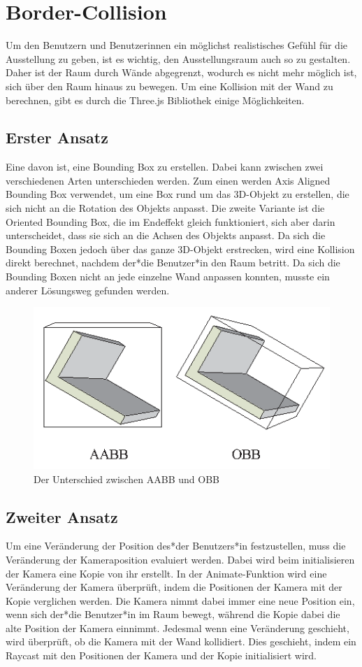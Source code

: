 \section{Border-Collision}

Um den Benutzern und Benutzerinnen ein möglichst realistisches Gefühl für die Ausstellung zu geben, ist es wichtig, den Ausstellungsraum auch so zu gestalten. Daher ist der Raum durch Wände abgegrenzt, wodurch es nicht mehr möglich ist, sich über den Raum hinaus zu bewegen. 
Um eine Kollision mit der Wand zu berechnen, gibt es durch die Three.js Bibliothek einige Möglichkeiten.


\subsection{Erster Ansatz}
Eine davon ist, eine Bounding Box zu erstellen. Dabei kann zwischen zwei verschiedenen Arten unterschieden werden. Zum einen werden Axis Aligned Bounding Box verwendet, um eine Box rund um das 3D-Objekt zu erstellen, die sich nicht an die Rotation des Objekts anpasst. Die zweite Variante ist die Oriented Bounding Box, die im Endeffekt gleich funktioniert, sich aber darin unterscheidet, dass sie sich an die Achsen des Objekts anpasst. Da sich die Bounding Boxen jedoch über das ganze 3D-Objekt erstrecken, wird eine Kollision direkt berechnet, nachdem der*die Benutzer*in den Raum betritt. Da sich die Bounding Boxen nicht an jede einzelne Wand anpassen konnten, musste ein anderer Lösungsweg gefunden werden.
\begin{figure}
    \centering
    \includegraphics[scale=0.65]{pics/aabb_obb.png}
    \caption{Der Unterschied zwischen AABB und OBB}
    \label{fig:impl:aabb_obb}
\end{figure}

\subsection{Zweiter Ansatz}
Um eine Veränderung der Position des*der Benutzers*in festzustellen, muss die Veränderung der Kameraposition evaluiert werden. Dabei wird beim initialisieren der Kamera eine Kopie von ihr erstellt. In der Animate-Funktion wird eine Veränderung der Kamera überprüft, indem die Positionen der Kamera mit der Kopie verglichen werden. Die Kamera nimmt dabei immer eine neue Position ein, wenn sich der*die Benutzer*in im Raum bewegt, während die Kopie dabei die alte Position der Kamera einnimmt.    
Jedesmal wenn eine Veränderung geschieht, wird überprüft, ob die Kamera mit der Wand kollidiert. Dies geschieht, indem ein Raycast mit den Positionen der Kamera und der Kopie initialisiert wird. 
